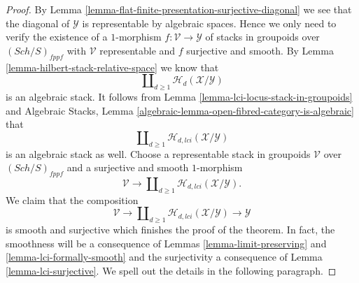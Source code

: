 \documentclass{stacks-project}
\theoremstyle{plain}
\theoremstyle{definition}
\theoremstyle{remark}
\numberwithin{equation}{subsection}
\def\Sch{\mathit{Sch}}
\begin{document}
\begin{proof}
By
Lemma \ref{lemma-flat-finite-presentation-surjective-diagonal}
we see that the diagonal of $\mathcal{Y}$ is representable by algebraic
spaces. Hence we only need to verify the existence of a $1$-morphism
$f : \mathcal{V} \to \mathcal{Y}$ of stacks in groupoids over
$(\Sch/S)_{fppf}$ with $\mathcal{V}$ representable and
$f$ surjective and smooth. By
Lemma \ref{lemma-hilbert-stack-relative-space}
we know that
$$
\coprod\nolimits_{d \geq 1} \mathcal{H}_d(\mathcal{X}/\mathcal{Y})
$$
is an algebraic stack. It follows from
Lemma \ref{lemma-lci-locus-stack-in-groupoids}
and
Algebraic Stacks,
Lemma \ref{algebraic-lemma-open-fibred-category-is-algebraic}
that
$$
\coprod\nolimits_{d \geq 1} \mathcal{H}_{d, lci}(\mathcal{X}/\mathcal{Y})
$$
is an algebraic stack as well. Choose a representable stack in groupoids
$\mathcal{V}$ over $(\Sch/S)_{fppf}$ and a surjective and smooth
$1$-morphism
$$
\mathcal{V}
\longrightarrow
\coprod\nolimits_{d \geq 1} \mathcal{H}_{d, lci}(\mathcal{X}/\mathcal{Y}).
$$
We claim that the composition
$$
\mathcal{V}
\longrightarrow
\coprod\nolimits_{d \geq 1} \mathcal{H}_{d, lci}(\mathcal{X}/\mathcal{Y})
\longrightarrow
\mathcal{Y}
$$
is smooth and surjective which finishes the proof of the theorem. In fact,
the smoothness will be a consequence of
Lemmas \ref{lemma-limit-preserving} and \ref{lemma-lci-formally-smooth}
and the surjectivity a consequence of
Lemma \ref{lemma-lci-surjective}.
We spell out the details in the following paragraph.


\end{proof}
\end{document}
